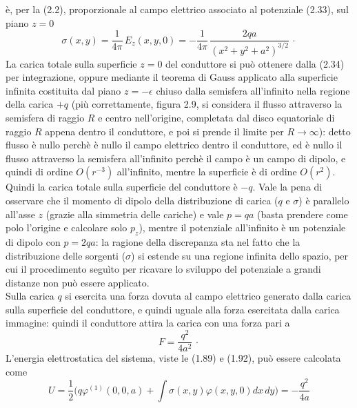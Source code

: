 \begin{enumerate}
    \`e, per la (2.2), proporzionale al campo elettrico associato al potenziale
    (2.33), sul piano $z=0$
    \begin{equation}
      \sigma(x,y)=\frac{1}{4\pi}\,E_z(x,y,0)
      =-\frac{1}{4\pi}\,\frac{2qa}{(x^2+y^2+a^2)^{3/2}}\,\cdot
      \tag{2.34}
    \end{equation}
    La carica totale sulla superficie $z=0$ del conduttore si pu\`o ottenere
    dalla (2.34) per integrazione, oppure mediante il teorema di Gauss applicato
    alla superficie infinita costituita dal piano $z=-\epsilon$ chiuso dalla
    semisfera all'infinito nella regione della carica $+q$ (pi\`u correttamente,
    figura 2.9, si considera il flusso attraverso la semisfera di raggio $R$ e
    centro nell'origine, completata dal disco equatoriale di raggio $R$ appena
    dentro il conduttore, e poi si prende il limite per $R\to\infty$): detto
    flusso \`e nullo perch\`e \`e nullo il campo elettrico dentro il conduttore,
    ed \`e nullo il flusso attraverso la semisfera all'infinito perch\`e il
    campo \`e un campo di dipolo, e quindi di ordine $O(r^{-3})$ all'infinito,
    mentre la superficie \`e di ordine $O(r^2)$. Quindi la carica totale sulla
    superficie del conduttore \`e $-q$.
    Vale la pena di osservare che il momento di dipolo della distribuzione di
    carica ($q$ e $\sigma$) \`e parallelo all'asse $z$ (grazie alla simmetria
    delle cariche) e vale $p=qa$ (basta
    prendere come polo l'origine e calcolare solo $p_z$), mentre il potenziale
    all'infinito \`e un potenziale di dipolo con $p=2qa$: la ragione della
    discrepanza sta nel fatto che la distribuzione delle sorgenti ($\sigma$) si
    estende su una regione infinita dello spazio, per cui il procedimento
    segu\`ito per ricavare lo sviluppo del potenziale a grandi distanze non
    pu\`o essere applicato.\\
    Sulla carica $q$ si esercita una forza dovuta al campo elettrico generato
    dalla carica sulla superficie del conduttore, e quindi uguale alla forza
    esercitata dalla carica immagine: quindi il conduttore attira la carica con
    una forza pari a
    \begin{equation}
      F=\frac{q^2}{4a^2}\,\cdot
      \tag{2.35}
    \end{equation}
    L'energia elettrostatica del sistema, viste le (1.89) e (1.92), pu\`o essere
    calcolata come
    \begin{equation}
      U=\frac12\Big(q\varphi^{(1)}(0,0,a)
      +\int\sigma(x,y)\varphi(x,y,0)dx\,dy\Big)=-\frac{q^2}{4a}

\end{equation}
\end{enumerate}
